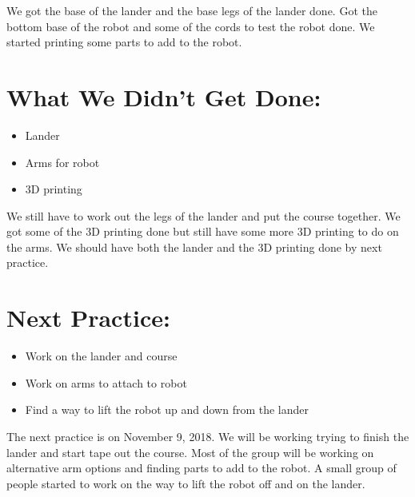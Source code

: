 \documentclass[12pt]{article}
\begin{document}
We got the base of the lander and the base legs of the lander done. Got the bottom base of the robot and some of the cords to test the robot done. We started printing some parts to add to the robot.

\section{What We Didn't Get Done:} %
\begin{itemize}
	\item Lander
\item Arms for robot
\item 3D printing
\end{itemize}

We still have to work out the legs of the lander and put the course together. We got some of the 3D printing done but still have some more 3D printing to do on the arms. We should have both the lander and the 3D printing done by next practice.

\section{Next Practice:}
\begin{itemize}
	\item Work on the lander and course
\item Work on arms to attach to robot
\item Find a way to lift the robot up and down from the lander 
\end{itemize}

The next practice is on November 9, 2018. We will be working trying to finish the lander and start tape out the course. Most of the group will be working on alternative arm options and finding parts to add to the robot. A small group of people started to work on the way to lift the robot off and on the lander.
\end{document}
